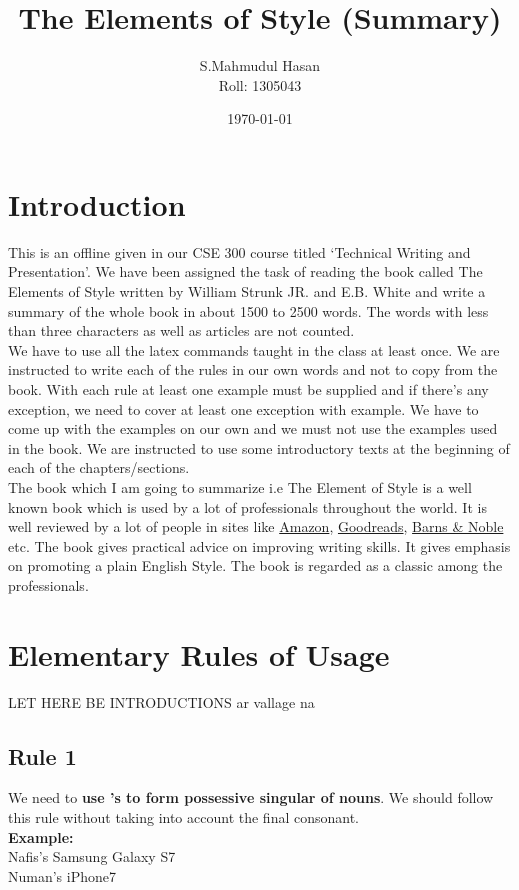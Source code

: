 \documentclass{report}
\begin{document}
\title{The Elements of Style (Summary)}
\author{S.Mahmudul Hasan\\Roll: 1305043}
\date{\today}
\maketitle
\tableofcontents


\chapter{Introduction}
\raggedright  %
This is an offline given in our CSE 300 course titled `Technical Writing and Presentation'. We have been assigned the task of reading the book called The Elements of Style written by William Strunk JR. and E.B. White and write a summary of the whole book in about 1500 to 2500 words. The words with less than three characters as well as articles are not counted.\\
We have to use all the latex commands taught in the class at least once. We are instructed to write each of the rules in our own words and not to copy from the book. With each rule at least one example must be supplied and if there's any exception, we need to cover at least one exception with example. We have to come up with the examples on our own and we must not use the examples used in the book. We are instructed to use some introductory texts at the beginning of each of the chapters/sections.\\
The book which I am going to summarize i.e The Element of Style is a well known book which is used by a lot of professionals throughout the world. It is well reviewed by a lot of people in sites like \href{https://www.amazon.com/Elements-Style-William-Strunk-Jr/dp/1557427283}{Amazon}, \href{http://www.goodreads.com/book/show/33514.The_Elements_of_Style}{Goodreads}, \href{http://www.barnesandnoble.com/w/the-elements-of-style-william-strunk/1116794279}{Barns \& Noble} etc.
The book gives practical advice on improving writing skills. It gives emphasis on promoting a plain English Style. The book is regarded as a classic among the professionals.

\chapter{Elementary Rules of Usage}
\raggedright
LET HERE BE INTRODUCTIONS ar vallage na 

\section{Rule 1}
We need to \textbf{use 's to form possessive singular of nouns}. We should follow this rule without taking into account the final consonant.\\
\textbf{Example:}\\
Nafis's Samsung Galaxy S7\\
Numan's iPhone7\\
\end{document}
